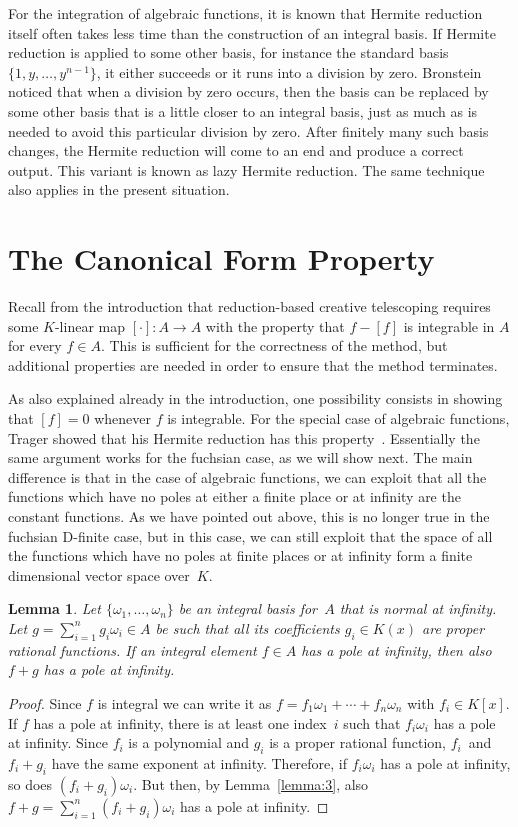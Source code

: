 \documentclass{sig-alternate}
\newtheorem{lemma}[theorem]{Lemma}
\begin{document}
For the integration of algebraic functions, it is known that Hermite reduction itself often
takes less time than the construction of an integral basis. If Hermite reduction is applied to some
other basis, for instance the standard basis $\{1,y,\dots,y^{n-1}\}$, it
either succeeds or it runs into a division by zero.
Bronstein~\cite{bronstein98a} noticed that when a division by zero occurs,
then the basis can be replaced by some other basis that is a little closer to
an integral basis, just as much as is needed to avoid this particular division
by zero. After finitely many such basis changes, the Hermite reduction will
come to an end and produce a correct output. This variant is known as lazy
Hermite reduction. The same technique also applies in the present situation.

\section{The Canonical Form Property}\label{sec:canonic}

Recall from the introduction that reduction-based creative telescoping requires
some $K$-linear map $[\cdot]\colon A\to A$ with the property that
$f-[f]$ is integrable in $A$ for every $f\in A$. This is sufficient for the
correctness of the method, but additional properties are needed in order to
ensure that the method terminates.

As also explained already in the introduction, one possibility consists in
showing that $[f]=0$ whenever $f$ is integrable. For the special case of
algebraic functions, Trager showed that his Hermite reduction has this
property~\cite[page 50, Theorem 1]{trager84}. Essentially the same argument
works for the fuchsian case, as we will show next. The main difference is
that in the case of algebraic functions, we can exploit that all the functions
which have no poles at either a finite place or at infinity are the constant
functions. As we have pointed out above, this is no longer true in the fuchsian
D-finite case, but in this case, we can still exploit that the space of all
the functions which have no poles at finite places or at infinity form a finite
dimensional vector space over~$K$.

\begin{lemma}\label{lemma:pole_at_inf}
Let $\{\omega_1,\dots,\omega_n\}$ be an integral basis for~$A$ that is normal at
infinity. Let $g=\sum_{i=1}^ng_i\omega_i\in A$ be such that all its
coefficients $g_i\in K(x)$ are proper rational functions. If an integral
element $f\in A$ has a pole at infinity, then also $f+g$ has a pole at
infinity.
\end{lemma}
\begin{proof}
Since $f$ is integral we can write it as
$f=f_1\omega_1+\cdots+f_n\omega_n$ with $f_i\in K[x]$.
If $f$ has a pole at infinity, there is at least one index~$i$
such that $f_i\omega_i$ has a pole at infinity.
Since $f_i$ is a polynomial and $g_i$ is a proper rational function,
$f_i$~and $f_i+g_i$ have the same exponent at infinity.
Therefore, if $f_i\omega_i$ has a pole at infinity, so does $(f_i+g_i)\omega_i$.
But then, by Lemma~\ref{lemma:3}, also $f+g=\sum_{i=1}^n(f_i+g_i)\omega_i$ has
a pole at infinity.
\end{proof}
\end{document}
